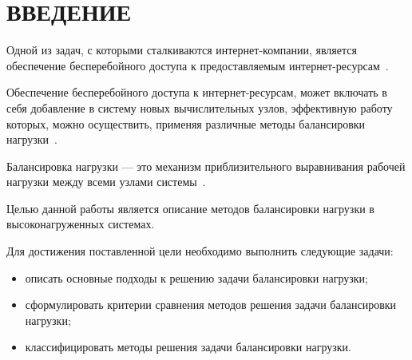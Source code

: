 \chapter*{ВВЕДЕНИЕ}

Одной из задач, с которыми сталкиваются интернет-компании, является обеспечение бесперебойного доступа к предоставляемым интернет-ресурсам~\cite{webact}.

Обеспечение бесперебойного доступа к интернет-ресурсам, может включать в себя добавление в систему новых вычислительных узлов, эффективную работу которых, можно осуществить, применяя различные методы балансировки нагрузки~\cite{strategies, com_analysis, gaud, part_algos}.

Балансировка нагрузки --- это механизм приблизительного выравнивания рабочей нагрузки между всеми узлами системы~\cite{anal, gaud}.

Целью данной работы является описание методов балансировки нагрузки в высоконагруженных системах.

Для достижения поставленной цели необходимо выполнить следующие задачи:
\begin{itemize}
	\item описать основные подходы к решению задачи балансировки нагрузки;
	\item сформулировать критерии сравнения методов решения задачи балансировки нагрузки;
	\item классифицировать методы решения задачи балансировки нагрузки.
\end{itemize}

